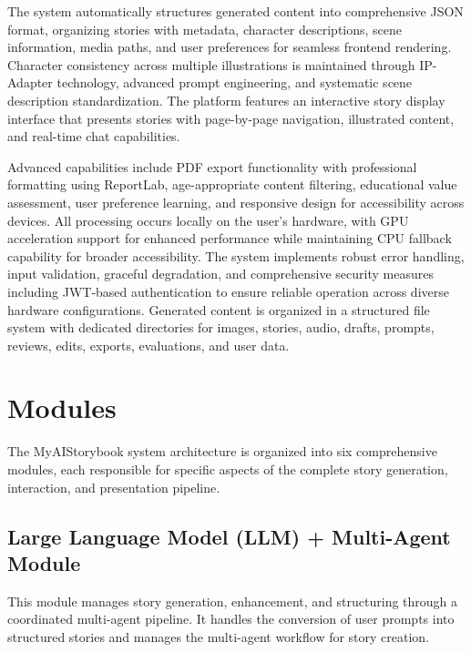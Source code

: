 The system automatically structures generated content into comprehensive JSON format, organizing stories with metadata, character descriptions, scene information, media paths, and user preferences for seamless frontend rendering. Character consistency across multiple illustrations is maintained through IP-Adapter technology, advanced prompt engineering, and systematic scene description standardization. The platform features an interactive story display interface that presents stories with page-by-page navigation, illustrated content, and real-time chat capabilities.

Advanced capabilities include PDF export functionality with professional formatting using ReportLab, age-appropriate content filtering, educational value assessment, user preference learning, and responsive design for accessibility across devices. All processing occurs locally on the user's hardware, with GPU acceleration support for enhanced performance while maintaining CPU fallback capability for broader accessibility. The system implements robust error handling, input validation, graceful degradation, and comprehensive security measures including JWT-based authentication to ensure reliable operation across diverse hardware configurations. Generated content is organized in a structured file system with dedicated directories for images, stories, audio, drafts, prompts, reviews, edits, exports, evaluations, and user data.

\section{Modules}

The MyAIStorybook system architecture is organized into six comprehensive modules, each responsible for specific aspects of the complete story generation, interaction, and presentation pipeline.

\subsection{Large Language Model (LLM) + Multi-Agent Module}

This module manages story generation, enhancement, and structuring through a coordinated multi-agent pipeline. It handles the conversion of user prompts into structured stories and manages the multi-agent workflow for story creation.

